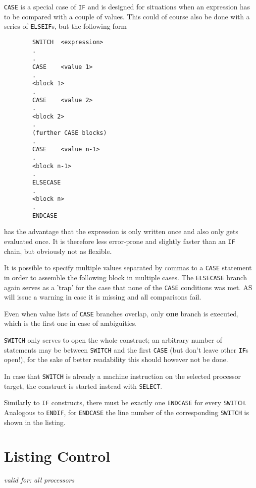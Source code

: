 \documentclass[12pt,twoside]{report}
\newcommand{\bb}[1]{{\bf #1}}
\newcommand{\tty}[1]{{\tt #1}}
\begin{document}
\tty{CASE} is a special case of \tty{IF} and is designed for situations
when an expression has to be compared with a couple of values.  This could
of course also be done with a series of \tty{ELSEIF}s, but the following
form
\begin{verbatim}
        SWITCH  <expression>
        .
        .
        CASE    <value 1>
        .
        <block 1>
        .
        CASE    <value 2>
        .
        <block 2>
        .
        (further CASE blocks)
        .
        CASE    <value n-1>
        .
        <block n-1>
        .
        ELSECASE
        .
        <block n>
        .
        ENDCASE
\end{verbatim}
has the advantage that the expression is only written once and also only
gets evaluated once.  It is therefore less error-prone and slightly faster
than an \tty{IF} chain, but obviously not as flexible.

It is possible to specify multiple values separated by commas to a
\tty{CASE} statement in order to assemble the following block in multiple
cases.  The \tty{ELSECASE} branch again serves as a 'trap' for the case
that none of the \tty{CASE} conditions was met.  AS will issue a warning
in case it is missing and all comparisons fail.

Even when value lists of \tty{CASE} branches overlap, only \bb{one} branch
is executed, which is the first one in case of ambiguities.

\tty{SWITCH} only serves to open the whole construct; an arbitrary number
of statements may be between \tty{SWITCH} and the first \tty{CASE} (but
don't leave other \tty{IF}s open!), for the sake of better readability
this should however not be done.

In case that \tty{SWITCH} is already a machine instruction on the
selected processor target, the construct is started instead with
\tty{SELECT}.

Similarly to {\tt IF} constructs, there must be exactly one {\tt ENDCASE}
for every {\tt SWITCH}.  Analogous to {\tt ENDIF}, for {\tt ENDCASE} the
line number of the corresponding {\tt SWITCH} is shown in the listing.


\section{Listing Control}

{\em valid for: all processors}
\end{document}

